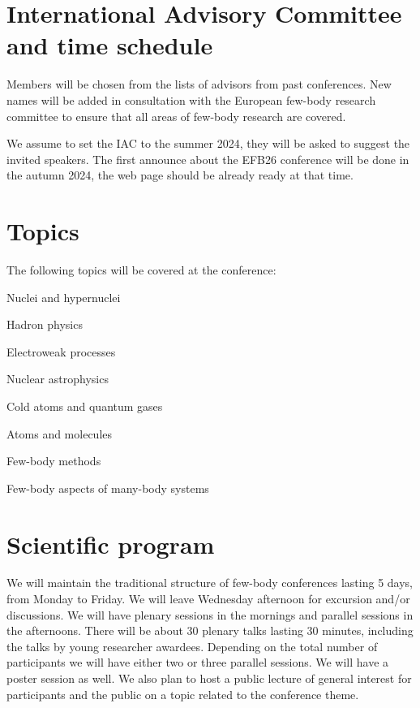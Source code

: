 \documentclass[12pt]{extarticle}
\newcommand*\sq{\mathbin{\vcenter{\hbox{\rule{.8ex}{.8ex}}}}}
\newenvironment{t_sq_itemize}
{\begin{itemize}[topsep=0pt, parsep=0pt, itemsep=0pt, leftmargin=*]
    \renewcommand{\labelitemi}{{\(\sq\)}}}
  {\end{itemize}}
\begin{document}
\section*{International Advisory Committee and time schedule}
\noindent
%
Members will be chosen from the lists of advisors from past conferences. New names
will be added in consultation with the European few-body research committee to ensure that all
areas of few-body research are covered. 

We assume to set the IAC to the summer 2024, they will be asked to suggest the invited speakers. 
The first announce about the EFB26 conference will be done in the autumn 2024, the web page
should be already ready at that time.

\section*{Topics}
\noindent
The following topics will be covered at the conference:
\begin{t_sq_itemize}
\item Nuclei and hypernuclei
\item Hadron physics
\item Electroweak processes
\item Nuclear astrophysics
\item Cold atoms and quantum gases
\item Atoms and molecules
\item Few-body methods
\item Few-body aspects of many-body systems
\end{t_sq_itemize}

\section*{Scientific program}
\noindent
We will maintain the traditional structure of few-body conferences lasting 5 days, from Monday
to Friday. We will leave Wednesday afternoon for excursion and/or discussions. We will have plenary sessions
in the mornings and parallel sessions in the afternoons. There will be about 30 plenary talks lasting
30 minutes, including the talks by young researcher awardees. Depending on the total number of
participants we will have either two or three parallel sessions. We will have a poster session as well.
We also plan to host a public lecture of general interest for participants and the public on a topic related
to the conference theme. 
\end{document}
